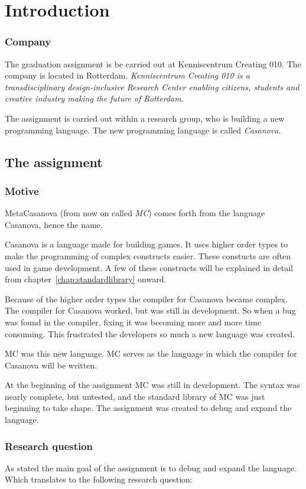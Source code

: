 \chapter{Introduction}
\subsection{Company}
The graduation assignment is be carried out at Kenniscentrum Creating 010.
The company is located in Rotterdam.
\textit{Kenniscentrum Creating 010 is a transdisciplinary design-inclusive Research Center enabling citizens, students and creative industry making the future of Rotterdam}\cite{creating2016home}.

The assignment is carried out within a research group, who is building a new programming language.
The new programming language is called \emph{Casanova}.


\section{The assignment}
\subsection{Motive}
MetaCasanova (from now on called \emph{MC}) comes forth from the language Casanova, hence the name.

Casanova is a language made for building games.
It uses higher order types to make the programming of complex constructs easier.
These constucts are often used in game development.
A few of these constructs will be explained in detail from chapter~\ref{chap:standardlibrary} onward.

Because of the higher order types the compiler for Casanova became complex.
The compiler for Casanova worked, but was still in development.
So when a bug was found in the compiler, fixing it was becoming more and more time consuming.
This frustrated the developers so much a new language was created.

MC was this new language.
MC serves as the language in which the compiler for Casanova will be written.

At the beginning of the assignment MC was still in development.
The syntax was nearly complete, but untested, and the standard library of MC was just beginning to take shape.
The assignment was created to debug and expand the language.


\subsection{Research question}
As stated the main goal of the assignment is to debug and expand the language.
Which translates to the following research question:

